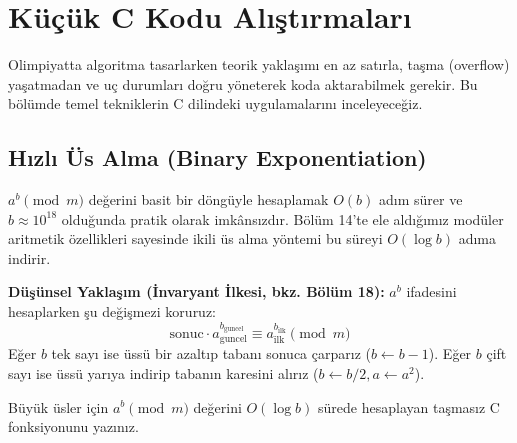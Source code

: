 \section{Küçük C Kodu Alıştırmaları}

Olimpiyatta algoritma tasarlarken teorik yaklaşımı en az satırla, taşma (overflow) yaşatmadan ve uç durumları doğru yöneterek koda aktarabilmek gerekir. Bu bölümde temel tekniklerin C dilindeki uygulamalarını inceleyeceğiz.

\subsection{Hızlı Üs Alma (Binary Exponentiation)}

$a^b \pmod m$ değerini basit bir döngüyle hesaplamak $O(b)$ adım sürer ve $b \approx 10^{18}$ olduğunda pratik olarak imkânsızdır. Bölüm 14'te ele aldığımız modüler aritmetik özellikleri sayesinde ikili üs alma yöntemi bu süreyi $O(\log b)$ adıma indirir.

\textbf{Düşünsel Yaklaşım (İnvaryant İlkesi, bkz. Bölüm 18):}
$a^b$ ifadesini hesaplarken şu değişmezi koruruz:
\[
\text{sonuc} \cdot a_{\text{guncel}}^{b_{\text{guncel}}} \equiv a_{\text{ilk}}^{b_{\text{ilk}}} \pmod m
\]
Eğer $b$ tek sayı ise üssü bir azaltıp tabanı sonuca çarparız ($b \gets b - 1$). Eğer $b$ çift sayı ise üssü yarıya indirip tabanın karesini alırız ($b \gets b / 2, a \gets a^2$).

\begin{example}
Büyük üsler için $a^b \pmod m$ değerini $O(\log b)$ sürede hesaplayan taşmasız C fonksiyonunu yazınız.
\end{example}

